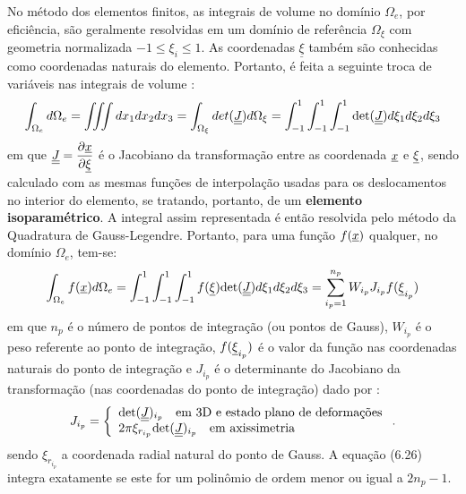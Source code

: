 No método dos elementos finitos, as integrais de volume no domínio  $\Omega_e$, por eficiência, são geralmente resolvidas em um domínio de referência $\Omega_\xi$ com geometria normalizada $-1 \le \xi_i \le 1$. As coordenadas $\underline \xi$ também são conhecidas como coordenadas naturais do elemento. Portanto, é feita a seguinte troca de variáveis nas integrais de volume \cite[p. 147]{Zienkiewicz2005}:
\begin{equation}
	\label{eq:troca_variavel_integral_volume}
	\int_{\Omega_e}d\Omega_e = \iiint dx_1 dx_2 dx_3 = \int_{\Omega_\xi}det(\underline{\underline J})d\Omega_\xi = \int_{-1}^{1}\int_{-1}^{1}\int_{-1}^{1}\text{det}(\underline{\underline J})d\xi_1d\xi_2d\xi_3
\end{equation}
em que $\underline{\underline J} = \dfrac{\partial \underline x}{\partial \underline{\xi}}$  é o Jacobiano da transformação entre as coordenada $\underline x$ e $\underline{\xi}$, sendo calculado com as mesmas funções de interpolação usadas para os deslocamentos no interior do elemento, se tratando, portanto, de um \textbf{elemento isoparamétrico}. A integral assim representada é então resolvida pelo método da Quadratura de Gauss-Legendre. Portanto, para uma função $f(\underline x)$ qualquer, no domínio $\Omega_e$, tem-se:
\begin{equation}
	\label{eq:troca_variavel_integral_volume}
	\int_{\Omega_e}f(\underline x)d\Omega_e = \int_{-1}^{1}\int_{-1}^{1}\int_{-1}^{1}f(\underline{\xi})\text{det}(\underline{\underline J})d\xi_1d\xi_2d\xi_3 = \sum_{i_p=1}^{n_p}W_{i_p}J_{i_p}f(\underline{\xi}_{i_p})
\end{equation}
em que $n_p$ é o número de pontos de integração (ou pontos de Gauss), $W_{i_p}$ é o peso referente ao ponto de integração, $f(\underline{\xi}_{i_p})$ é o valor da função nas coordenadas naturais do ponto de integração e $J_{i_p}$ é o determinante do Jacobiano da transformação (nas coordenadas do ponto de integração) dado por \cite[p. 206-207]{Zienkiewicz2005}:
\begin{equation}
	\label{eq:jacobiano_transformacao}
	J_{i_p} = \left\{
	\begin{array}{lcl}
		 \text{det}(\underline{\underline J})_{i_p}~~~\text{em 3D e estado plano de deformações} \\
		2\pi\xi_{r_{i_p}}\text{det}(\underline{\underline J})_{i_p} ~~~\text{em axissimetria}
	\end{array}
\right..
\end{equation}
sendo $\xi_{r_{i_p}}$ a coordenada radial natural do ponto de Gauss. A equação (6.26) integra  exatamente se este for um polinômio de ordem menor ou igual a $2n_p-1$.

